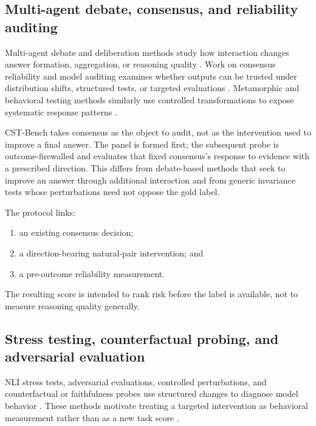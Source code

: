 \documentclass[11pt]{article}
\begin{document}
\subsection{Multi-agent debate, consensus, and reliability auditing}

Multi-agent debate and deliberation methods study how interaction changes answer formation, aggregation, or reasoning quality \citep{du-etal-2024-multiagent-debate,irving-etal-2018-ai-safety-debate}. Work on consensus reliability and model auditing examines whether outputs can be trusted under distribution shifts, structured tests, or targeted evaluations \citep{liang-etal-2022-helm,lin-etal-2022-truthfulqa,ovadia-etal-2019-uncertainty-shift}. Metamorphic and behavioral testing methods similarly use controlled transformations to expose systematic response patterns \citep{ribeiro-etal-2020-beyond,naik-etal-2018-stress}.

CST-Bench takes consensus as the object to audit, not as the intervention used to improve a final answer. The panel is formed first; the subsequent probe is outcome-firewalled and evaluates that fixed consensus's response to evidence with a prescribed direction. This differs from debate-based methods that seek to improve an answer through additional interaction and from generic invariance tests whose perturbations need not oppose the gold label.

The protocol links:

\begin{enumerate}
  \item an existing consensus decision;
  \item a direction-bearing natural-pair intervention; and
  \item a pre-outcome reliability measurement.
\end{enumerate}

The resulting score is intended to rank risk before the label is available, not to measure reasoning quality generally.

\subsection{Stress testing, counterfactual probing, and adversarial evaluation}

NLI stress tests, adversarial evaluations, controlled perturbations, and counterfactual or faithfulness probes use structured changes to diagnose model behavior \citep{naik-etal-2018-stress,glockner-etal-2018-breaking,kaushik-etal-2019-counterfactually-augmented}. These methods motivate treating a targeted intervention as behavioral measurement rather than as a new task score \citep{ribeiro-etal-2020-beyond,naik-etal-2018-stress}.
\end{document}
